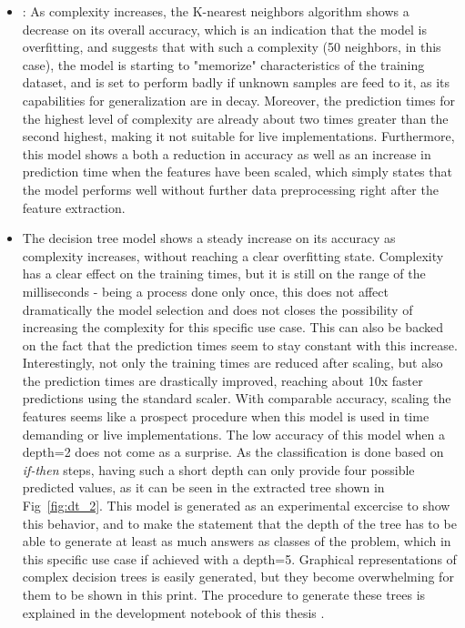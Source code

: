 \begin{itemize}
    \item: As complexity increases, the K-nearest neighbors algorithm shows a decrease on its overall accuracy, which is an indication that the model is overfitting, and suggests that with such a complexity (50 neighbors, in this case), the model is starting to "memorize" characteristics of the training dataset, and is set to perform badly if unknown samples are feed to it, as its capabilities for generalization are in decay. Moreover, the prediction times for the highest level of complexity are already about two times greater than the second highest, making it not suitable for live implementations. Furthermore, this model shows a both a reduction in accuracy as well as an increase in prediction time when the features have been scaled, which simply states that the model performs well without further data preprocessing right after the feature extraction.
    \item The decision tree model shows a steady increase on its accuracy as complexity increases, without reaching a clear overfitting state. Complexity has a clear effect on the training times, but it is still on the range of the milliseconds - being a process done only once, this does not affect dramatically the model selection and does not closes the possibility of increasing the complexity for this specific use case. This can also be backed on the fact that  the prediction times seem to stay constant with this increase. Interestingly, not only the training times are reduced after scaling, but also the prediction times are drastically improved, reaching about 10x faster predictions using the standard scaler. With comparable accuracy, scaling the features seems like a prospect procedure when this model is used in time demanding or live implementations.
        The low accuracy of this model when a depth=2 does not come as a surprise. As the classification is done based on \emph{if-then} steps, having such a short depth can only provide four possible predicted values, as it can be seen in the extracted tree shown in Fig~\ref{fig:dt_2}. This model is generated as an experimental excercise to show this behavior, and to make the statement that the depth of the tree has to be able to generate at least as much answers as classes of the problem, which in this specific use case if achieved with a depth=5. Graphical representations of complex decision trees is easily generated, but they become overwhelming for them to be shown in this print. The procedure to generate these trees is explained in the development notebook of this thesis \cite{repo:cognitive_radio_ml}.


\end{itemize}
